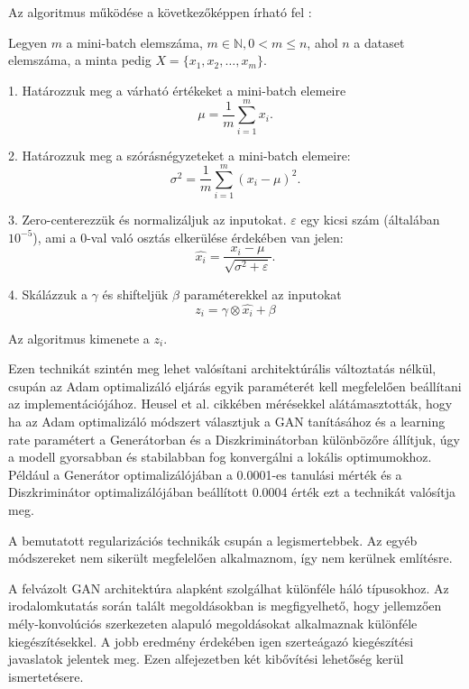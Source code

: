 Az algoritmus működése a következőképpen írható fel \cite{geron2019hands}:

Legyen $m$ a mini-batch elemszáma, $m \in \mathbb{N}, 0 < m \leq n$, ahol $n$ a dataset elemszáma, a minta pedig $X = \{x_1, x_2, \ldots, x_m \}$. 

1. Határozzuk meg a várható értékeket a mini-batch elemeire
$$ \mu = \frac{1}{m} \sum_{i=1}^{m} x_i. $$

2. Határozzuk meg a szórásnégyzeteket a mini-batch elemeire:
$$ \sigma^2 = \frac{1}{m} \sum_{i=1}^{m} (x_i - \mu)^2. $$

3. Zero-centerezzük és normalizáljuk az inputokat. $\varepsilon$ egy kicsi szám (általában $10^{-5}$), ami a 0-val való osztás elkerülése érdekében van jelen:
$$ \hat{x_i} = \frac{x_i - \mu}{\sqrt{\sigma^2 + \varepsilon}}. $$

4. Skálázzuk a $\gamma$ és shifteljük $\beta$ paraméterekkel az inputokat
$$ z_i = \gamma \otimes \hat{x_i} + \beta$$

Az algoritmus kimenete a $z_i$.


Ezen technikát szintén meg lehet valósítani architektúrális változtatás nélkül, csupán az Adam optimalizáló eljárás egyik paraméterét kell megfelelően beállítani az implementációjához.
Heusel et al. \cite{heusel2017gans} cikkében mérésekkel alátámasztották, hogy ha az Adam optimalizáló módszert választjuk a GAN tanításához és a learning rate paramétert a Generátorban és a Diszkriminátorban különbözőre állítjuk, úgy a modell gyorsabban és stabilabban fog konvergálni a lokális optimumokhoz.
Például a Generátor optimalizálójában a 0.0001-es tanulási mérték és a Diszkriminátor optimalizálójában beállított 0.0004 érték ezt a technikát valósítja meg.

A bemutatott regularizációs technikák csupán a legismertebbek. Az egyéb módszereket nem sikerült megfelelően alkalmaznom, így nem kerülnek említésre.


A felvázolt GAN architektúra  alapként szolgálhat különféle háló típusokhoz. Az irodalomkutatás során talált megoldásokban is megfigyelhető, hogy jellemzően mély-konvolúciós szerkezeten alapuló megoldásokat alkalmaznak különféle kiegészítésekkel. A jobb eredmény érdekében igen szerteágazó kiegészítési javaslatok jelentek meg. Ezen alfejezetben két kibővítési lehetőség kerül ismertetésere.


